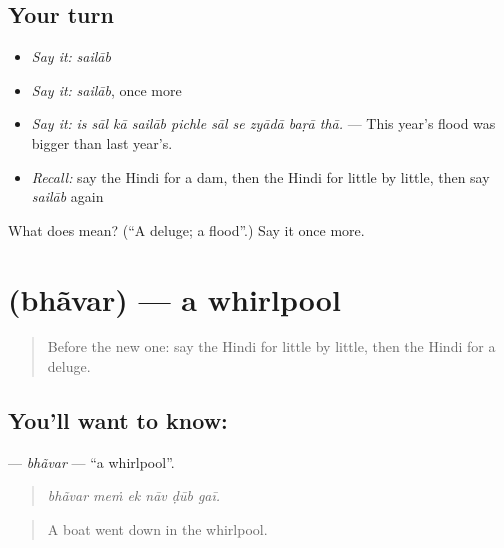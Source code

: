 \subsection*{Your turn}
\begin{itemize}
\raggedright
  \item \emph{Say it:} \emph{sailāb}
  \item \emph{Say it:} \emph{sailāb}, once more
  \item \emph{Say it:} \emph{is sāl kā sailāb pichle sāl se zyādā baṛā thā.} — This year's flood was bigger than last year's.
  \item \emph{Recall:} say the Hindi for a dam, then the Hindi for little by little, then say \emph{sailāb} again
\end{itemize}

\begin{tcolorbox}[breakable,colback=teal!4,colframe=teal!35!black,title={Before you move on}]
What does  mean? (\textquotedblleft{}A deluge; a flood\textquotedblright{}.) Say it once more.
\end{tcolorbox}
\section[\texorpdfstring{\hi{भँवर} (bhãvar)}{भँवर (bhãvar)}]{ (bhãvar) — a whirlpool}

\label{lesson:HI-C305-bhavar}



\begin{quote}
Before the new one: say the Hindi for little by little, then the Hindi for a deluge.
\end{quote}

\subsection*{You'll want to know: }
\textbf{} — \emph{bhãvar} — \textquotedblleft{}a whirlpool\textquotedblright{}.

\begin{quote}
     
\end{quote}

\begin{quote}
\emph{bhãvar meṁ ek nāv ḍūb gaī.}
\end{quote}

\begin{quote}
A boat went down in the whirlpool.
\end{quote}

